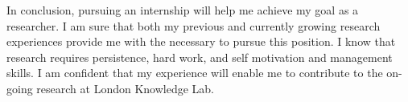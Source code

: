 \documentclass[12pt]{article}%
\begin{document}
	In conclusion, pursuing an internship will help me achieve my goal as a researcher.  I am sure that both my previous and currently growing research experiences provide me with the necessary to pursue this position. I know that research requires persistence, hard work, and self motivation and management skills. I am confident that my experience will enable me to contribute to the on-going research at London Knowledge Lab.



\end{document}
